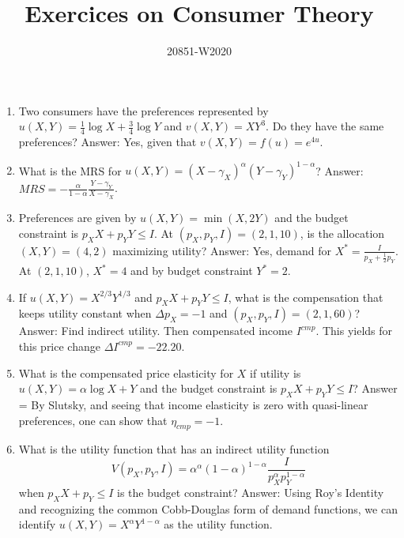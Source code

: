 \documentclass[11pt, oneside,french]{article}   	%
\title{Exercices on Consumer Theory}
\author{20851-W2020}
\date{}							%
\begin{document}
\maketitle

\begin{enumerate}
    \item Two consumers have the preferences represented by $u(X,Y) = \frac{1}{4}\log X + \frac{3}{4} \log Y$ and $v(X,Y) = XY^3$. Do they have the same preferences? Answer: Yes, given that $v(X,Y) = f(u) = e^{4u}$. 
    \item What is the MRS for $u(X,Y) = (X-\gamma_X)^\alpha (Y-\gamma_Y)^{1-\alpha}$? Answer: $MRS = -\frac{\alpha}{1-\alpha}\frac{Y-\gamma_Y}{X-\gamma_X}$.
    \item Preferences are given by $u(X,Y) = \min(X,2Y)$ and the budget constraint is $p_X X + p_Y Y \leq I$. At $(p_X,p_Y,I) = (2,1,10)$, is the allocation $(X,Y) = (4,2)$ maximizing utility? Answer: Yes, demand for $X^* = \frac{I}{p_X + \frac{1}{2}p_Y}$. At $(2,1,10)$, $X^* = 4$ and by budget constraint $Y^*=2$.
    \item If $u(X,Y) = X^{2/3}Y^{1/3}$ and $p_X X + p_Y Y \leq I$, what is the compensation that keeps utility constant when $\Delta p_X = -1$ and $(p_X,p_Y,I) = (2,1,60)$? Answer: Find indirect utility. Then compensated income $I^{cmp}$. This yields for this price change $\Delta I^{cmp} = -22.20$.
    \item What is the compensated price elasticity for $X$ if utility is $u(X,Y) = \alpha \log X + Y$ and the budget constraint is $p_X X + p_Y Y \leq I$? Answer = By Slutsky, and seeing that income elasticity is zero with quasi-linear preferences, one can show that $\eta_{cmp} = -1$.
    \item What is the utility function that has an indirect utility function $$V(p_X,p_Y,I) = \alpha^\alpha (1-\alpha)^{1-\alpha} \frac{I}{p_X^{\alpha} p_Y^{1-\alpha}} $$ when $p_X X + p_Y \leq I$ is the budget constraint? Answer: Using Roy's Identity and recognizing the common Cobb-Douglas form of demand functions, we can identify $u(X,Y) = X^{\alpha} Y^{1-\alpha}$ as the utility function.
    
\end{enumerate}
\end{document}

